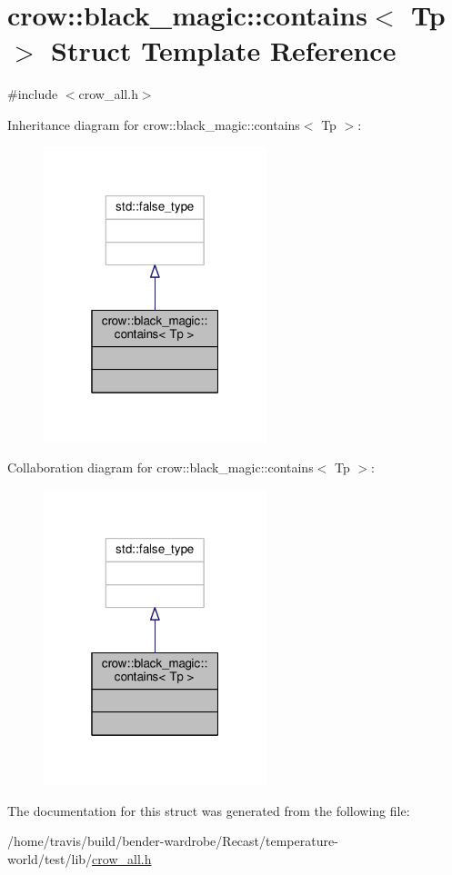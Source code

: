 \hypertarget{structcrow_1_1black__magic_1_1contains_3_01_tp_01_4}{\section{crow\-:\-:black\-\_\-magic\-:\-:contains$<$ Tp $>$ Struct Template Reference}
\label{structcrow_1_1black__magic_1_1contains_3_01_tp_01_4}
}


{\ttfamily \#include $<$crow\-\_\-all.\-h$>$}



Inheritance diagram for crow\-:\-:black\-\_\-magic\-:\-:contains$<$ Tp $>$\-:
\nopagebreak
\begin{figure}[H]
\begin{center}
\leavevmode
\includegraphics[width=184pt]{structcrow_1_1black__magic_1_1contains_3_01_tp_01_4__inherit__graph}
\end{center}
\end{figure}


Collaboration diagram for crow\-:\-:black\-\_\-magic\-:\-:contains$<$ Tp $>$\-:
\nopagebreak
\begin{figure}[H]
\begin{center}
\leavevmode
\includegraphics[width=184pt]{structcrow_1_1black__magic_1_1contains_3_01_tp_01_4__coll__graph}
\end{center}
\end{figure}


The documentation for this struct was generated from the following file\-:\begin{DoxyCompactItemize}
\item 
/home/travis/build/bender-\/wardrobe/\-Recast/temperature-\/world/test/lib/\hyperlink{crow__all_8h}{crow\-\_\-all.\-h}\end{DoxyCompactItemize}
